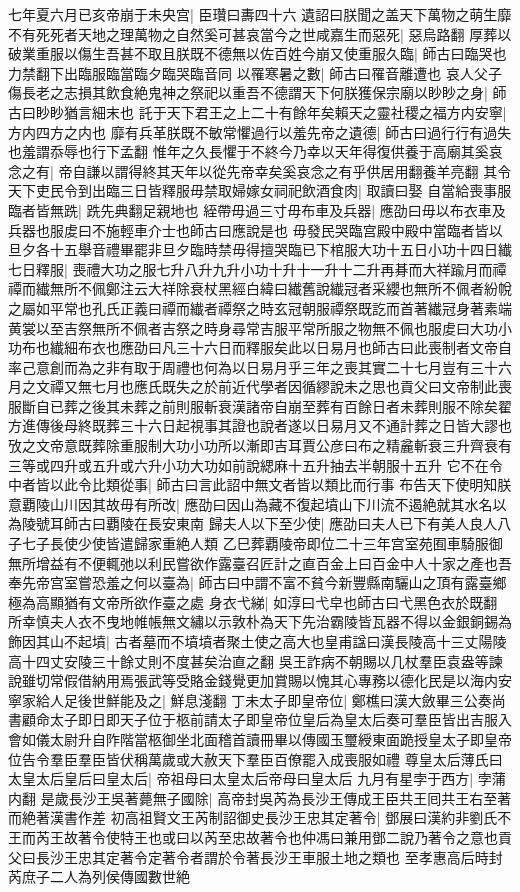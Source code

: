 七年夏六月已亥帝崩于未央宫|{
	臣瓚曰夀四十六}
遺詔曰朕聞之盖天下萬物之萌生靡不有死死者天地之理萬物之自然奚可甚哀當今之世咸嘉生而惡死|{
	惡烏路翻}
厚葬以破業重服以傷生吾甚不取且朕既不德無以佐百姓今崩又使重服久臨|{
	師古曰臨哭也力禁翻下出臨服臨當臨夕臨哭臨音同}
以罹寒暑之數|{
	師古曰罹音離遭也}
哀人父子傷長老之志損其飲食絶鬼神之祭祀以重吾不德謂天下何朕獲保宗廟以眇眇之身|{
	師古曰眇眇猶言細末也}
託于天下君王之上二十有餘年矣賴天之靈社稷之福方内安寧|{
	方内四方之内也}
靡有兵革朕既不敏常懼過行以羞先帝之遺德|{
	師古曰過行行有過失也羞謂忝辱也行下孟翻}
惟年之久長懼于不終今乃幸以天年得復供養于高廟其奚哀念之有|{
	帝自謙以謂得終其天年以從先帝幸矣奚哀念之有乎供居用翻養羊亮翻}
其令天下吏民令到出臨三日皆釋服毋禁取婦嫁女祠祀飲酒食肉|{
	取讀曰娶}
自當給喪事服臨者皆無跣|{
	跣先典翻足親地也}
絰帶毋過三寸毋布車及兵器|{
	應劭曰毋以布衣車及兵器也服䖍曰不施輕車介士也師古曰應說是也}
毋發民哭臨宫殿中殿中當臨者皆以旦夕各十五舉音禮畢罷非旦夕臨時禁毋得擅哭臨已下棺服大功十五日小功十四日纎七日釋服|{
	喪禮大功之服七升八升九升小功十升十一升十二升再朞而大祥踰月而禫禫而纎無所不佩鄭注云大祥除衰杖黑經白緯曰纎舊說纎冠者采纓也無所不佩者紛帨之屬如平常也孔氏正義曰禫而纎者禫祭之時玄冠朝服禫祭既訖而首著纎冠身著素端黄裳以至吉祭無所不佩者吉祭之時身尋常吉服平常所服之物無不佩也服䖍曰大功小功布也纎細布衣也應劭曰凡三十六日而釋服矣此以日易月也師古曰此喪制者文帝自率己意創而為之非有取于周禮也何為以日易月乎三年之喪其實二十七月豈有三十六月之文禫又無七月也應氏既失之於前近代學者因循繆說未之思也貢父曰文帝制此喪服斷自已葬之後其未葬之前則服斬衰漢諸帝自崩至葬有百餘日者未葬則服不除矣翟方進傳後母終既葬三十六日起視事其證也說者遂以日易月又不通計葬之日皆大謬也攷之文帝意既葬除重服制大功小功所以漸即吉耳賈公彦曰布之精麄斬衰三升齊衰有三等或四升或五升或六升小功大功如前說緦麻十五升抽去半朝服十五升}
它不在令中者皆以此令比類從事|{
	師古曰言此詔中無文者皆以類比而行事}
布告天下使明知朕意覇陵山川因其故毋有所改|{
	應劭曰因山為藏不復起墳山下川流不遏絶就其水名以為陵號耳師古曰覇陵在長安東南}
歸夫人以下至少使|{
	應劭曰夫人已下有美人良人八子七子長使少使皆遣歸家重絶人類}
乙巳葬覇陵帝即位二十三年宫室苑囿車騎服御無所增益有不便輒弛以利民嘗欲作露臺召匠計之直百金上曰百金中人十家之產也吾奉先帝宫室嘗恐羞之何以臺為|{
	師古曰中謂不富不貧今新豐縣南驪山之頂有露臺鄉極為高顯猶有文帝所欲作臺之處}
身衣弋綈|{
	如淳曰弋皁也師古曰弋黑色衣於既翻}
所幸慎夫人衣不曳地帷帳無文繡以示敦朴為天下先治霸陵皆瓦器不得以金銀銅錫為飾因其山不起墳|{
	古者墓而不墳墳者聚土使之高大也皇甫諡曰漢長陵高十三丈陽陵高十四丈安陵三十餘丈則不度甚矣治直之翻}
吳王詐病不朝賜以几杖羣臣袁盎等諫說雖切常假借納用焉張武等受賂金錢覺更加賞賜以愧其心專務以德化民是以海内安寧家給人足後世鮮能及之|{
	鮮息淺翻}
丁未太子即皇帝位|{
	鄭樵曰漢大斂畢三公奏尚書顧命太子即日即天子位于柩前請太子即皇帝位皇后為皇太后奏可羣臣皆出吉服入會如儀太尉升自阼階當柩御坐北面稽首讀冊畢以傳國玉璽綬東面跪授皇太子即皇帝位告令羣臣羣臣皆伏稱萬歲或大赦天下羣臣百僚罷入成喪服如禮}
尊皇太后薄氏曰太皇太后皇后曰皇太后|{
	帝祖母曰太皇太后帝母曰皇太后}
九月有星孛于西方|{
	孛蒲内翻}
是歲長沙王吳著薨無子國除|{
	高帝封吳芮為長沙王傳成王臣共王囘共王右至著而絶著漢書作差}
初高祖賢文王芮制詔御史長沙王忠其定著令|{
	鄧展曰漢約非劉氏不王而芮王故著令使特王也或曰以芮至忠故著令也仲馮曰兼用鄧二說乃著令之意也貢父曰長沙王忠其定著令定著令者謂於令著長沙王車服土地之類也}
至孝惠高后時封芮庶子二人為列侯傳國數世絶

